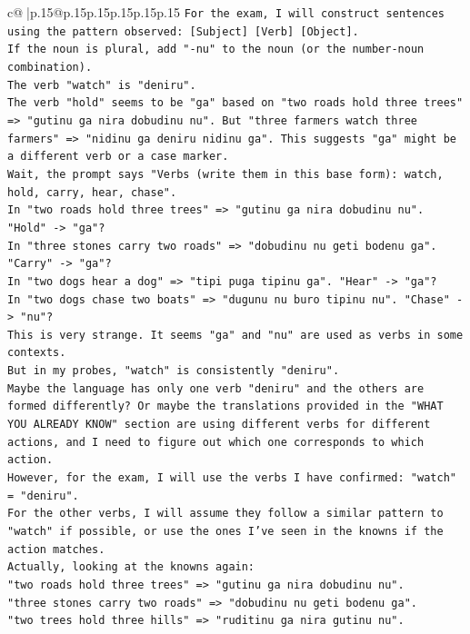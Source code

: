 \documentclass{article}
\begin{document}
{\begin{supertabular}{c@{$\;$}|p{.15\linewidth}@{}p{.15\linewidth}p{.15\linewidth}p{.15\linewidth}p{.15\linewidth}p{.15\linewidth}}
{{{\texttt{For the exam, I will construct sentences using the pattern observed: {[}Subject{]} {[}Verb{]} {[}Object{]}.} \\
\texttt{If the noun is plural, add "{-}nu" to the noun (or the number{-}noun combination).} \\
\texttt{The verb "watch" is "deniru".} \\
\texttt{The verb "hold" seems to be "ga" based on "two roads hold three trees" => "gutinu ga nira dobudinu nu". But "three farmers watch three farmers" => "nidinu ga deniru nidinu ga". This suggests "ga" might be a different verb or a case marker.} \\
\texttt{Wait, the prompt says "Verbs (write them in this base form): watch, hold, carry, hear, chase".} \\
\texttt{In "two roads hold three trees" => "gutinu ga nira dobudinu nu". "Hold" {-}> "ga"?} \\
\texttt{In "three stones carry two roads" => "dobudinu nu geti bodenu ga". "Carry" {-}> "ga"?} \\
\texttt{In "two dogs hear a dog" => "tipi puga tipinu ga". "Hear" {-}> "ga"?} \\
\texttt{In "two dogs chase two boats" => "dugunu nu buro tipinu nu". "Chase" {-}> "nu"?} \\
\texttt{This is very strange. It seems "ga" and "nu" are used as verbs in some contexts.} \\
\texttt{But in my probes, "watch" is consistently "deniru".} \\
\texttt{Maybe the language has only one verb "deniru" and the others are formed differently? Or maybe the translations provided in the "WHAT YOU ALREADY KNOW" section are using different verbs for different actions, and I need to figure out which one corresponds to which action.} \\
\texttt{However, for the exam, I will use the verbs I have confirmed: "watch" = "deniru".} \\
\texttt{For the other verbs, I will assume they follow a similar pattern to "watch" if possible, or use the ones I've seen in the knowns if the action matches.} \\
\texttt{Actually, looking at the knowns again:} \\
\texttt{"two roads hold three trees" => "gutinu ga nira dobudinu nu".} \\
\texttt{"three stones carry two roads" => "dobudinu nu geti bodenu ga".} \\
\texttt{"two trees hold three hills" => "ruditinu ga nira gutinu nu".} \\
}}}
\end{supertabular}}
\end{document}
